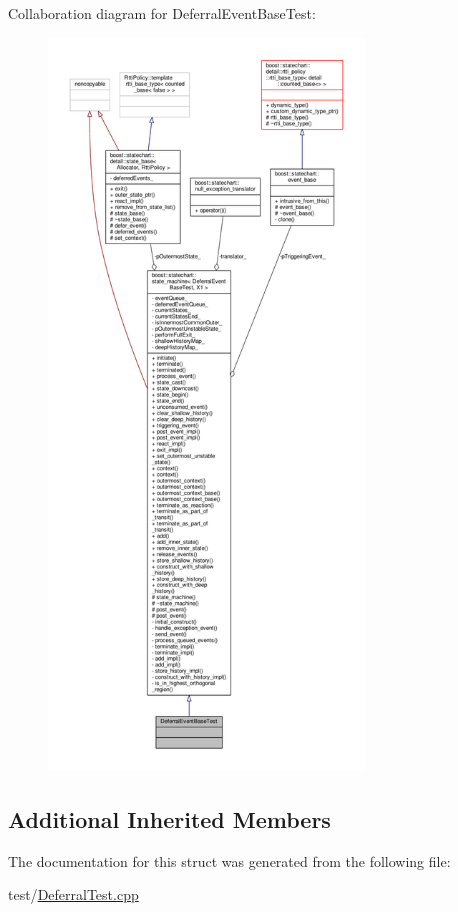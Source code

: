 Collaboration diagram for Deferral\+Event\+Base\+Test\+:
\nopagebreak
\begin{figure}[H]
\begin{center}
\leavevmode
\includegraphics[height=550pt]{struct_deferral_event_base_test__coll__graph}
\end{center}
\end{figure}
\subsection*{Additional Inherited Members}


The documentation for this struct was generated from the following file\+:\begin{DoxyCompactItemize}
\item 
test/\mbox{\hyperlink{_deferral_test_8cpp}{Deferral\+Test.\+cpp}}\end{DoxyCompactItemize}
